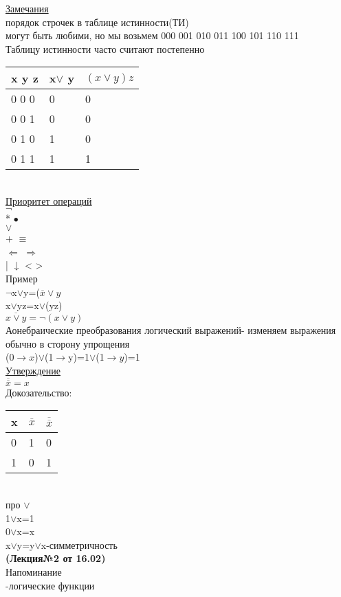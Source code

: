 \documentclass{article}
\begin{document}
\underline{Замечания}\\
порядок строчек в таблице истинности(ТИ)\\
могут быть любими, но мы возьмем 000 001 010 011 100 101 110 111\\
Таблицу истинности часто считают постепенно\\
\begin{tabular}{l|l|l}
x y z&x$\vee$ y&$(x\vee y)z$\\
\hline
0 0 0 &0&0\\
0 0 1 &0&0\\
0 1 0 &1&0\\
0 1 1 &1&1\\
\end{tabular}\\
\underline{Приоритет операций}\\
$\neg$\\
* $\bullet$\\
$\vee$\\
+ $\equiv$\\
$\Leftarrow$ $\Rightarrow$\\
| $\downarrow$ < >\\
Пример\\
$\neg$x$\vee$y=($\overline{x}\vee y$\\
x$\vee$yz=x$\vee$(yz)\\
$\overline{x\vee y}=\neg(x\vee y)$\\
Аонебраические преобразования логический выражений- изменяем выражения обычно в сторону упрощения\\
(0$\rightarrow x$)$\vee$(1$\rightarrow$y)=1$\vee$(1$\rightarrow y$)=1\\
\underline{Утверждение}\\
$\overline{\overline{x}}=x$\\
Докозательство: \begin{tabular}{l|l|l}
x&$\overline{x}$&$\overline{\overline{x}}$\\
\hline
0 &1&0\\
1 &0&1\\
\end{tabular}\\
про $\vee$\\
1$\vee$x=1\\
0$\vee$x=x\\
x$\vee$y=y$\vee$x-симметричность\\
\textbf{(Лекция№2 от 16.02)}\\
Напоминание\\
-логические функции\\
\end{document}
